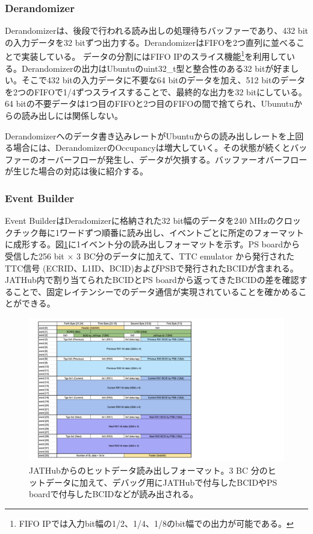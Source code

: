 \subsubsection{Derandomizer}
\baselineskip
Derandomizerは、後段で行われる読み出しの処理待ちバッファーであり、432 bitの入力データを32 bitずつ出力する。DerandomizerはFIFOを2つ直列に並べることで実装している。
データの分割にはFIFO IPのスライス機能\footnote{FIFO IPでは入力bit幅の1/2、1/4、1/8のbit幅での出力が可能である。}を利用している。Derandomizerの出力はUbuntuのuint32\_t型と整合性のある32 bitが好ましい。そこで432 bitの入力データに不要な64 bitのデータを加え、512 bitのデータを2つのFIFOで1/4ずつスライスすることで、最終的な出力を32 bitにしている。64 bitの不要データは1つ目のFIFOと2つ目のFIFOの間で捨てられ、Ubunutuからの読み出しには関係しない。

Derandomizerへのデータ書き込みレートがUbuntuからの読み出しレートを上回る場合には、DerandomizerのOccupancyは増大していく。その状態が続くとバッファーのオーバーフローが発生し、データが欠損する。バッファーオバーフローが生じた場合の対応は後に紹介する。

\subsubsection{Event Builder}
\baselineskip
Event BuilderはDeradomizerに格納された32 bit幅のデータを240 MHzのクロックチック毎に1ワードずつ順番に読み出し、イベントごとに所定のフォーマットに成形する。図\ref{JATHubhitformat}に1イベント分の読み出しフォーマットを示す。PS boardから受信した256 bit $\times$ 3 BC分のデータに加えて、TTC emulator から発行されたTTC信号 (ECRID、L1ID、BCID)およびPSBで発行されたBCIDが含まれる。JATHub内で割り当てられたBCIDとPS boardから返ってきたBCIDの差を確認することで、固定レイテンシーでのデータ通信が実現されていることを確かめることができる。

\begin{figure} 
\centering
\includegraphics[width=16cm]{fig/QAQC/JATHubhitformat.pdf}
\caption[JATHubからのヒットデータ読み出しフォーマット]{JATHubからのヒットデータ読み出しフォーマット。3 BC 分のヒットデータに加えて、デバッグ用にJATHubで付与したBCIDやPS boardで付与したBCIDなどが読み出される。}
\label{JATHubhitformat}
\end{figure}

